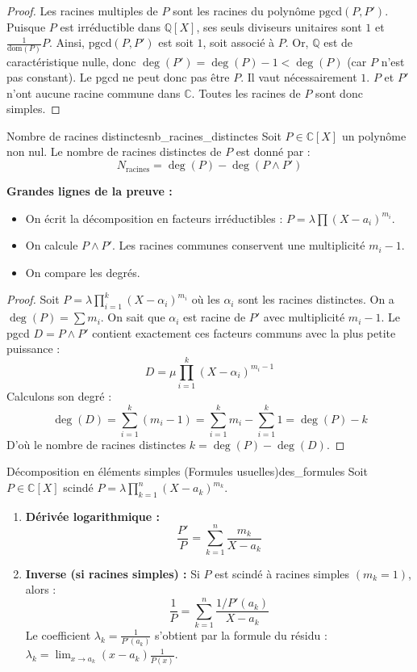 \documentclass{prepacours}
\begin{document}
\begin{proof}
    Les racines multiples de $P$ sont les racines du polynôme $\text{pgcd}(P, P')$.
    Puisque $P$ est irréductible dans $\mathbb{Q}[X]$, ses seuls diviseurs unitaires sont $1$ et $\frac{1}{\text{dom}(P)}P$.
    Ainsi, $\text{pgcd}(P, P')$ est soit $1$, soit associé à $P$.
    Or, $\mathbb{Q}$ est de caractéristique nulle, donc $\deg(P') = \deg(P) - 1 < \deg(P)$ (car $P$ n'est pas constant).
    Le pgcd ne peut donc pas être $P$.
    Il vaut nécessairement $1$. $P$ et $P'$ n'ont aucune racine commune dans $\mathbb{C}$.
    Toutes les racines de $P$ sont donc simples.
\end{proof}

\begin{proposition}{Nombre de racines distinctes}{nb_racines_distinctes}
    Soit $P \in \mathbb{C}[X]$ un polynôme non nul. Le nombre de racines distinctes de $P$ est donné par :
    \[ N_{\text{racines}} = \deg(P) - \deg(P \wedge P') \]
\end{proposition}

\noindent \textbf{Grandes lignes de la preuve :}
\begin{itemize}
    \item On écrit la décomposition en facteurs irréductibles : $P = \lambda \prod (X - a_i)^{m_i}$.
    \item On calcule $P \wedge P'$. Les racines communes conservent une multiplicité $m_i - 1$.
    \item On compare les degrés.
\end{itemize}

\begin{proof}
    Soit $P = \lambda \prod_{i=1}^k (X - \alpha_i)^{m_i}$ où les $\alpha_i$ sont les racines distinctes. On a $\deg(P) = \sum m_i$.
    On sait que $\alpha_i$ est racine de $P'$ avec multiplicité $m_i - 1$.
    Le pgcd $D = P \wedge P'$ contient exactement ces facteurs communs avec la plus petite puissance :
    \[ D = \mu \prod_{i=1}^k (X - \alpha_i)^{m_i - 1} \]
    Calculons son degré :
    \[ \deg(D) = \sum_{i=1}^k (m_i - 1) = \sum_{i=1}^k m_i - \sum_{i=1}^k 1 = \deg(P) - k \]
    D'où le nombre de racines distinctes $k = \deg(P) - \deg(D)$.
\end{proof}

\begin{proposition}{Décomposition en éléments simples (Formules usuelles)}{des_formules}
    Soit $P \in \mathbb{C}[X]$ scindé $P = \lambda \prod_{k=1}^n (X-a_k)^{m_k}$.
    \begin{enumerate}
        \item \textbf{Dérivée logarithmique :}
        \[ \frac{P'}{P} = \sum_{k=1}^n \frac{m_k}{X - a_k} \]
        \item \textbf{Inverse (si racines simples) :} Si $P$ est scindé à racines simples $(m_k=1)$, alors :
        \[ \frac{1}{P} = \sum_{k=1}^n \frac{1/P'(a_k)}{X - a_k} \]
        Le coefficient $\lambda_k = \frac{1}{P'(a_k)}$ s'obtient par la formule du résidu : $\lambda_k = \lim_{x \to a_k} (x-a_k)\frac{1}{P(x)}$.
    \end{enumerate}
\end{proposition}
\end{document}

